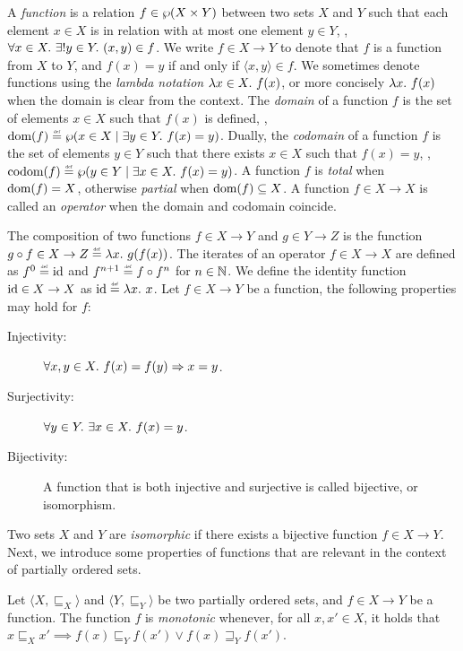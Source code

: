 A \emph{function} is a relation $f\in\wp(X \times Y)$ between two sets $X$ and $Y$ such that each element $x \in X$ is in relation with at most one element $y \in Y$, \ie, $\forall x \in X.~ \exists! y \in Y.~ (x, y) \in f$. We write $f \in X \to Y$ to denote that $f$ is a function from $X$ to $Y$, and $f(x) = y$ if and only if $\langle x, y \rangle \in f$.
We sometimes denote functions using the \emph{lambda notation} $\lambda x \in X.~ f(x)$, or more concisely $\lambda x.~ f(x)$ when the domain is clear from the context.
The \emph{domain} of a function $f$ is the set of elements $x \in X$ such that $f(x)$ is defined, \ie, $\dom(f) \defeq \setof{x \in X \mid \exists y \in Y.\spacer f(x) = y}$. Dually, the \emph{codomain} of a function $f$ is the set of elements $y \in Y$ such that there exists $x \in X$ such that $f(x) = y$, \ie, $\codom(f) \defeq \setof{y \in Y \mid \exists x \in X.\spacer f(x) = y}$. A function $f$ is \emph{total} when $\textup{dom}(f) = X$, otherwise \emph{partial} when $\textup{dom}(f) \subseteq X$.
A function $f\in X \to X$ is called an \emph{operator} when the domain and codomain coincide.

The {composition} of two functions $f \in X \to Y$ and $g \in Y \to Z$ is the function $g \circ f \in X \to Z \defeq \lambda x.\spacer g(f(x))$.
The {iterates} of an operator $f \in X \to X$ are defined as $f^0 \defeq \identity$ and $f^{n+1} \defeq f \circ f^n$ for $n \in \mathbb{N}$.
We define the {identity} function $\textup{id}\in X \to X$ as $\identity \defeq \lambda x.\spacer x$.
Let $f \in X \to Y$ be a function, the following properties may hold for $f$:
\begin{description}
  \item[Injectivity:] $\forall x, y \in X.~ f(x) = f(y) \Rightarrow x = y$.
  \item[Surjectivity:] $\forall y \in Y.~ \exists x \in X.~ f(x) = y$.
  \item[Bijectivity:] A function that is both injective and surjective is called bijective, or isomorphism.
\end{description}
Two sets $X$ and $Y$ are \emph{isomorphic} if there exists a bijective function $f \in X \to Y$.
%
Next, we introduce some properties of functions that are relevant in the context of partially ordered sets.

\begin{definition}[Monotonicity]
  Let $\langle X, \sqsubseteq_X \rangle$ and $\langle Y, \sqsubseteq_Y \rangle$ be two partially ordered sets, and $f\in X \to Y$ be a function.
  The function $f$ is \emph{monotonic} whenever, for all $x, x' \in X$, it holds that $x \sqsubseteq_X x' \implies f(x) \sqsubseteq_Y f(x') \lor f(x) \sqsupseteq_Y f(x')$.
\end{definition}

